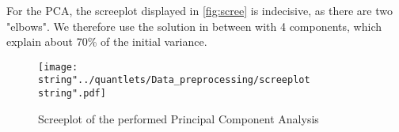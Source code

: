 For the PCA, the screeplot displayed in \autoref{fig:scree} is indecisive, as there are two "elbows".  We therefore use the solution in between with 4 components, which explain about 70\% of the initial variance.  

\begin{figure}[H]
  \centering
\texttt{[image: \\string"../quantlets/Data\_preprocessing/screeplot\\string".pdf]}
  \caption{Screeplot of the performed Principal Component Analysis}\label{fig:scree}
\end{figure}



 



